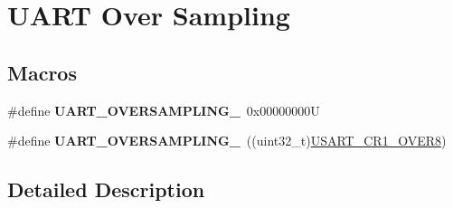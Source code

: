 \hypertarget{group___u_a_r_t___over___sampling}{}\section{U\+A\+RT Over Sampling}
\label{group___u_a_r_t___over___sampling}
\subsection*{Macros}
\begin{DoxyCompactItemize}
\item 
\mbox{\label{group___u_a_r_t___over___sampling_gaa6a320ec65d248d76f21de818db1a2f0}} 
\#define {\bfseries U\+A\+R\+T\+\_\+\+O\+V\+E\+R\+S\+A\+M\+P\+L\+I\+N\+G\+\_}~0x00000000U
\item 
\mbox{\label{group___u_a_r_t___over___sampling_gaeb13896e8bdc1bb041e01a86a868ee0b}} 
\#define {\bfseries U\+A\+R\+T\+\_\+\+O\+V\+E\+R\+S\+A\+M\+P\+L\+I\+N\+G\+\_}~((uint32\+\_\+t)\mbox{\hyperlink{group___peripheral___registers___bits___definition_gaed6caeb0cb48f1a7b34090f31a92a8e2}{U\+S\+A\+R\+T\+\_\+\+C\+R1\+\_\+\+O\+V\+E\+R8}})
\end{DoxyCompactItemize}


\subsection{Detailed Description}
